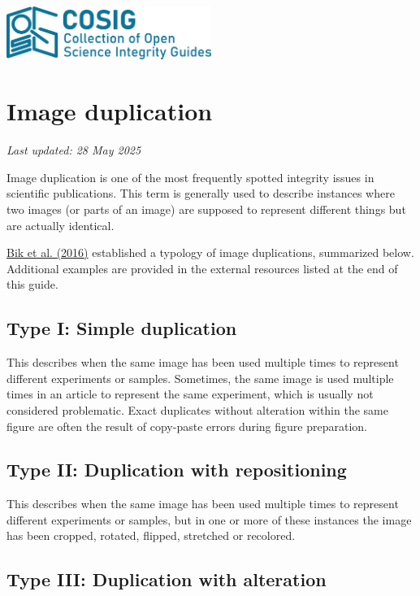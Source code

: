 \documentclass[letterpaper, 12pt]{article}
\begin{document}
\flushleft
\includegraphics[width=0.5\textwidth]{img/home/241017_final_logo_mockup.png}

\section*{Image duplication}
\textit{Last updated: 28 May 2025}

Image duplication is one of the most frequently spotted integrity issues in scientific publications. This term is generally used to describe instances where two images (or parts of an image) are supposed to represent different things but are actually identical.

\href{https://doi.org/10.1128/mbio.00809-16}{Bik et al. (2016)} established a typology of image duplications, summarized below. Additional examples are provided in the external resources listed at the end of this guide.

\subsection*{Type I: Simple duplication}

This describes when the same image has been used multiple times to represent different experiments or samples. Sometimes, the same image is used multiple times in an article to represent the same experiment, which is usually not considered problematic. Exact duplicates without alteration within the same figure are often the result of copy-paste errors during figure preparation.

\subsection*{Type II: Duplication with repositioning}

This describes when the same image has been used multiple times to represent different experiments or samples, but in one or more of these instances the image has been cropped, rotated, flipped, stretched or recolored.

\subsection*{Type III: Duplication with alteration} 
\end{document}
